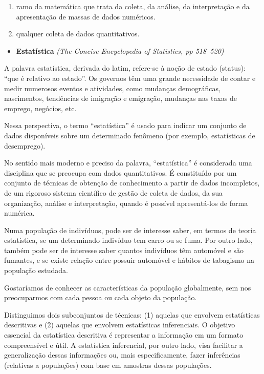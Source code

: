 \documentclass[
]{book}
\providecommand{\tightlist}{%
  \setlength{\itemsep}{0pt}\setlength{\parskip}{0pt}}
\begin{document}
\begin{enumerate}
\def\labelenumi{\arabic{enumi}.}
\tightlist
\item
  ramo da matemática que trata da coleta, da análise, da interpretação e da apresentação de massas de dados numéricos.\\
\item
  qualquer coleta de dados quantitativos.
\end{enumerate}

\begin{itemize}
\tightlist
\item
  \textbf{Estatística} \emph{(The Concise Encyclopedia of Statistics, pp 518--520)}
\end{itemize}

A palavra estatística, derivada do latim, refere-se à noção de estado (status): ``que é relativo ao estado''. Os governos têm uma grande necessidade de contar e medir numerosos eventos e atividades, como mudanças demográficas, nascimentos, tendências de imigração e emigração, mudanças nas taxas de emprego, negócios, etc.

Nessa perspectiva, o termo ``estatística'' é usado para indicar um conjunto de dados disponíveis sobre um determinado fenômeno (por exemplo, estatísticas de desemprego).

No sentido mais moderno e preciso da palavra, ``estatística'' é considerada uma disciplina que se preocupa com dados quantitativos. É constituído por um conjunto de técnicas de obtenção de conhecimento a partir de dados incompletos, de um rigoroso sistema científico de gestão de coleta de dados, da sua organização, análise e interpretação, quando é possível apresentá-los de forma numérica.

Numa população de indivíduos, pode ser de interesse saber, em termos de teoria estatística, se um determinado indivíduo tem carro ou se fuma. Por outro lado, também pode ser de interesse saber quantos indivíduos têm automóvel e são fumantes, e se existe relação entre possuir automóvel e hábitos de tabagismo na população estudada.

Gostaríamos de conhecer as características da população globalmente, sem nos preocuparmos com cada pessoa ou cada objeto da população.

Distinguimos dois subconjuntos de técnicas: (1) aquelas que envolvem estatísticas descritivas e (2) aquelas que envolvem estatísticas inferenciais. O objetivo essencial da estatística descritiva é representar a informação em um formato compreensível e útil. A estatística inferencial, por outro lado, visa facilitar a generalização dessas informações ou, mais especificamente, fazer inferências (relativas a populações) com base em amostras dessas populações.
\end{document}
